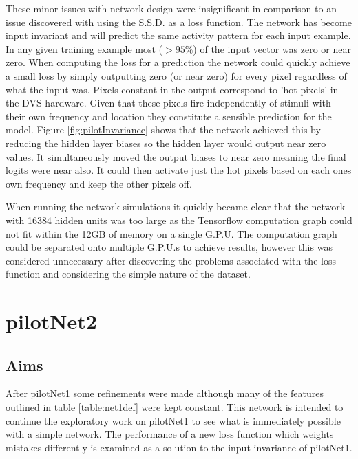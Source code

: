 These minor issues with network design were insignificant in comparison to an issue discovered with using the S.S.D. as a loss function. 
The network has become input invariant and will predict the same activity pattern for each input example. 
In any given training example most ($>95\%$) of the input vector was zero or near zero. 
When computing the loss for a prediction the network could quickly achieve a small loss by simply outputting zero (or near zero) for every pixel regardless of what the input was. 
Pixels constant in the output correspond to 'hot pixels' in the DVS hardware. 
Given that these pixels fire independently of stimuli with their own frequency and location they constitute a sensible prediction for the model. 
Figure \ref{fig:pilotInvariance} shows that the network achieved this by reducing the hidden layer biases so the hidden layer would output near zero values. 
It simultaneously moved the output biases to near zero meaning the final logits were near also. 
It could then activate just the hot pixels based on each ones own frequency and keep the other pixels off. 


When running the network simulations it quickly became clear that the network with 16384 hidden units was too large as the Tensorflow computation graph could not fit within the 12GB of memory on a single G.P.U.
The computation graph could be separated onto multiple G.P.U.s to achieve results, however this was considered unnecessary after discovering the problems associated with the loss function and considering the simple nature of the dataset.




\section{pilotNet2}

\subsection{Aims}
After pilotNet1 some refinements were made although many of the features outlined in table \ref{table:net1def} were kept constant. 
This network is intended to continue the exploratory work on pilotNet1 to see what is immediately possible with a simple network.
The performance of a new loss function which weights mistakes differently is examined as a solution to the input invariance of pilotNet1.

